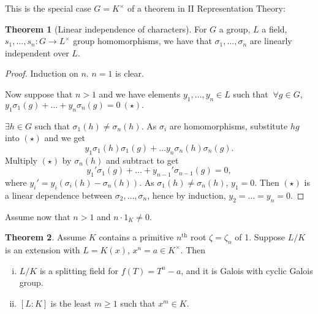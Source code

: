\documentclass{article}
\theoremstyle{definition}
\newtheorem{theorem}{Theorem}[section]
\begin{document}
This is the special case $G=K^{\times}$ of a theorem in II Representation Theory:
\begin{theorem}[Linear independence of characters]
    For $G$ a group, $L$ a field, $s_1,\ldots,s_n : G \to L^{\times}$ group homomorphisms, we have that $\sigma_1,\ldots,\sigma_n$ are linearly independent over $L$.
\end{theorem}
\begin{proof}
    Induction on $n$. $n=1$ is clear.

    Now suppose that $n>1$ and we have elements $y_1,\ldots,y_n \in L$ such that $~\forall g \in G$, $y_1 \sigma_1(g) + \ldots + y_n \sigma_n(g) = 0 ~(\star).$ 

    $\exists h \in G$ such that $\sigma_1(h) \neq\sigma_n(h)$. As $\sigma_i$ are homomorphisms, substitute $hg$ into $(\star)$ and we get \[
    y_1 \sigma_1(h)\sigma_1(g) + \ldots y_n \sigma_n(h) \sigma_n(g).
    \]
    Multiply $(\star)$ by $\sigma_n(h)$ and subtract to get \[
    y_1' \sigma_1(g) + \ldots + y_{n-1}' \sigma_{n-1}(g) = 0,
    \]
    where $y_i'=y_i(\sigma_i(h)-\sigma_n(h))$. As $\sigma_1(h) \neq \sigma_n(h)$, $y_1=0$. Then $(\star)$ is a linear dependence between $\sigma_2,\ldots,\sigma_n$, hence by induction, $y_2=\ldots=y_n=0$.
\end{proof}
Assume now that $n>1$ and $n\cdot 1_K \neq 0$.
\begin{theorem}
    Assume $K$ contains a primitive $n^{\text{th}}$ root $\zeta=\zeta_n$ of 1. Suppose $L/K$ is an extension with $L=K(x)$, $x^n=a \in K^{\times}$. Then
    \begin{enumerate}[(i)]
        \item $L/K$ is a splitting field for $f(T)=T^n-a$, and it is Galois with cyclic Galois group.
        \item $[L:K]$ is the least $m\ge 1$ such that $x^m \in K$.
    \end{enumerate}
\end{theorem}
\end{document}
